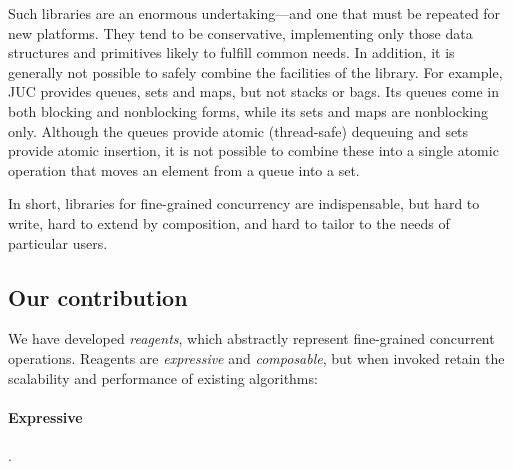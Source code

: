 \documentclass[preprint]{sigplanconf}
\begin{document}
Such libraries are an enormous undertaking---and one that must be repeated for
new platforms.  They tend to be conservative, implementing only those data
structures and primitives likely to fulfill common needs.  In addition, it is
generally not possible to safely combine the facilities of the library.  For
example, JUC provides queues, sets and maps, but not stacks or bags.  Its
queues come in both blocking and nonblocking forms, while its sets and maps
are nonblocking only.  Although the queues provide atomic (thread-safe)
dequeuing and sets provide atomic insertion, it is not possible to combine
these into a single atomic operation that moves an element from a queue into a
set.

In short, libraries for fine-grained concurrency are indispensable, but hard
to write, hard to extend by composition, and hard to tailor to the needs of
particular users.

\subsection*{Our contribution}





We have developed \emph{reagents}, which abstractly represent fine-grained
concurrent operations.  Reagents are \emph{expressive} and \emph{composable},
but when invoked retain the scalability and performance of existing
algorithms:




\paragraph{Expressive}  .
\end{document}
